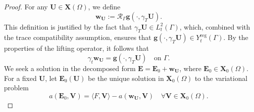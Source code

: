 \documentclass[10pt,a4paper]{amsart}
\numberwithin{equation}{section}
\begin{document}
\begin{proof}
For any $\mathbf{U} \in \mathbf{X}(\Omega)$, we define
\[
\mathbf{w}_{\mathbf{U}} := \mathcal{R}_\Gamma \mathbf{g}(\cdot, \gamma_T \mathbf{U}).
\]
This definition is justified by the fact that $\gamma_T \mathbf{U} \in L_t^2(\Gamma)$, which, combined with the trace compatibility assumption, ensures that $\mathbf{g}(\cdot, \gamma_T \mathbf{U}) \in Y_t^{\mathrm{reg}}(\Gamma)$. By the properties of the lifting operator, it follows that
\[
\gamma_t \mathbf{w}_{\mathbf{U}} = \mathbf{g}(\cdot, \gamma_T \mathbf{U}) \quad \text{on } \Gamma.
\]
We seek a solution in the decomposed form $\mathbf{E} = \mathbf{E}_0 + \mathbf{w}_{\mathbf{U}}$, where $\mathbf{E}_0 \in \mathbf{X}_0(\Omega)$. For a fixed $\mathbf{U}$, let $\mathbf{E}_0(\mathbf{U})$ be the unique solution in $\mathbf{X}_0(\Omega)$ to the variational problem
\begin{equation}\label{eq:NPEC_E0_weak}
a(\mathbf{E}_0, \mathbf{V}) = \langle F, \mathbf{V} \rangle - a(\mathbf{w}_{\mathbf{U}}, \mathbf{V}) \quad \forall \mathbf{V} \in \mathbf{X}_0(\Omega).
\end{equation}


\end{proof}
\end{document}
